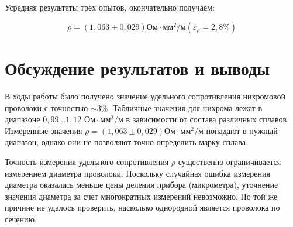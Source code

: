 \documentclass[a4paper,12pt]{article}
\begin{document}
Усредняя результаты трёх опытов, окончательно получаем:

\begin{equation}
\overline{\rho} = \underline{\left( 1,063 \pm 0,029 \right) \text{Ом} \cdot \text{мм}^2 / \text{м}} \left( \varepsilon_\rho = 2,8 \% \right) 
\end{equation}

\section{Обсуждение результатов и выводы}

В ходы работы было получено значение удельного сопротивления нихромовой проволоки с точностью $ \sim 3 \% $. Табличные значения для нихрома лежат в диапазоне $ 0,99 \dots 1,12 \text{ Ом} \cdot \text{мм}^2 / \text{м}$ в зависимости от состава различных сплавов. Измеренные значения $ \rho = \left( 1,063 \pm 0,029 \right) \text{Ом} \cdot \text{мм}^2 / \text{м} $ попадают в нужный диапазон, однако они не позволяют точно определить марку сплава.

\medskip

\noindent Точность измерения удельного сопротивления $ \rho $ существенно ограничивается измерением
диаметра проволоки. Поскольку случайная ошибка измерения диаметра оказалась меньше
цены деления прибора (микрометра), уточнение значения диаметра за счет многократных измерений невозможно. По той же причине не удалось проверить, насколько однородной является проволока по сечению.
\end{document}
